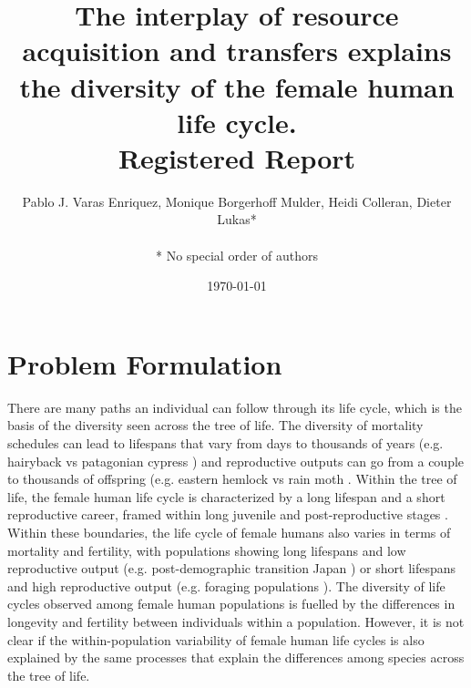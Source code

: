 \documentclass{article}
\title{The interplay of resource acquisition and transfers explains the diversity of the female human life cycle.
\\
Registered Report}
\author{Pablo J. Varas Enriquez, Monique Borgerhoff Mulder, Heidi Colleran, Dieter Lukas*\\\\
* No special order of authors}
\date{\today}
\begin{document}
\maketitle

\tableofcontents

\section{Problem Formulation}

There are many paths an individual can follow through its life cycle, which is the basis of the diversity seen across the tree of life. The diversity of mortality schedules can lead to lifespans that vary from days to thousands of years (e.g. hairyback vs patagonian cypress \citep{balsamo1988life,lara19933620}) and reproductive outputs can go from a couple to thousands of offspring (e.g. eastern hemlock vs rain moth \citep{tindale1932revision,van2017lifetime}. Within the tree of life, the female human life cycle is characterized by a long lifespan and a short reproductive career, framed within long juvenile and post-reproductive stages \citep{kaplan2000theory}. Within these boundaries, the life cycle of female humans also varies in terms of mortality and fertility, with populations showing long lifespans and low reproductive output (e.g. post-demographic transition Japan \citep{de2017maximum}) or short lifespans and high reproductive output (e.g. foraging populations \citep{migliano2007life}). The diversity of life cycles observed among female human populations is fuelled by the differences in longevity and fertility between individuals within a population. However, it is not clear if the within-population variability of female human life cycles is also explained by the same processes that explain the differences among species across the tree of life. 
\\\\
\end{document}
